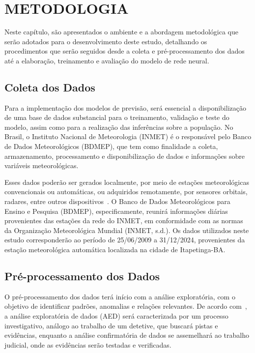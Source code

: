 \chapter{METODOLOGIA} %

    Neste capítulo, são apresentados o ambiente e a abordagem metodológica que serão adotados para o 
    desenvolvimento deste estudo, detalhando os procedimentos que serão seguidos desde a coleta e 
    pré-processamento dos dados até a elaboração, treinamento e avaliação do modelo de rede neural.

\section{Coleta dos Dados}

    Para a implementação dos modelos de previsão, será essencial a disponibilização de uma base de dados 
    substancial para o treinamento, validação e teste do modelo, assim como para a realização das inferências 
    sobre a população. No Brasil, o Instituto Nacional de Meteorologia (INMET) é o responsável pelo Banco de 
    Dados Meteorológicos (BDMEP), que tem como finalidade a coleta, armazenamento, processamento e 
    disponibilização de dados e informações sobre variáveis meteorológicas.

    Esses dados poderão ser gerados localmente, por meio de estações meteorológicas convencionais ou 
    automáticas, ou adquiridos remotamente, por sensores orbitais, radares, entre outros 
    dispositivos~\cite{vianna2017}. O Banco de Dados Meteorológicos para Ensino e Pesquisa (BDMEP), 
    especificamente, reunirá informações diárias provenientes das estações da rede do INMET, em 
    conformidade com as normas da Organização Meteorológica Mundial (INMET, s.d.). Os dados utilizados 
    neste estudo corresponderão ao período de 25/06/2009 a 31/12/2024, provenientes da estação meteorológica 
    automática localizada na cidade de Itapetinga-BA.

\section{Pré-processamento dos Dados}

    O pré-processamento dos dados terá início com a análise exploratória, com o objetivo de identificar 
    padrões, anomalias e relações relevantes. De acordo com~, a análise exploratória 
    de dados (AED) será caracterizada por um processo investigativo, análogo ao trabalho de um detetive, 
    que buscará pistas e evidências, enquanto a análise confirmatória de dados se assemelhará ao trabalho 
    judicial, onde as evidências serão testadas e verificadas.

